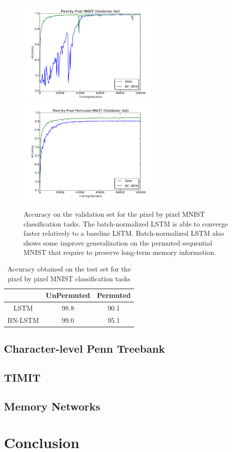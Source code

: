 \documentclass{article} %
\begin{document}
\begin{figure}
\center
\includegraphics[width=7cm]{figures/unpermuted_valid.pdf}
\includegraphics[width=7cm]{figures/permuted_valid.pdf}
\caption{Accuracy on the validation set for the pixel by pixel MNIST classification tasks. The batch-normalized LSTM is able to converge faster relatively to a baseline LSTM.
  Batch-normalized  LSTM also shows some improve generalization on the permuted sequential MNIST that require to preserve long-term memory information.}
\label{fig:seqmnist_valid}
\end{figure}


\begin{table}

\begin{tabular}{c|c|c}
   & UnPermuted & Permuted\\
  \hline
  LSTM & 98.8 & 90.1\\
  BN-LSTM & 99.0 & 95.1\\
\end{tabular}
\caption{Accuracy obtained on the test set for the pixel by pixel MNIST classification tasks}
\label{tab:seqmnist_test}

\end{table}

\subsection{Character-level Penn Treebank}

\subsection{TIMIT}

\subsection{Memory Networks}

\section{Conclusion}
\end{document}
